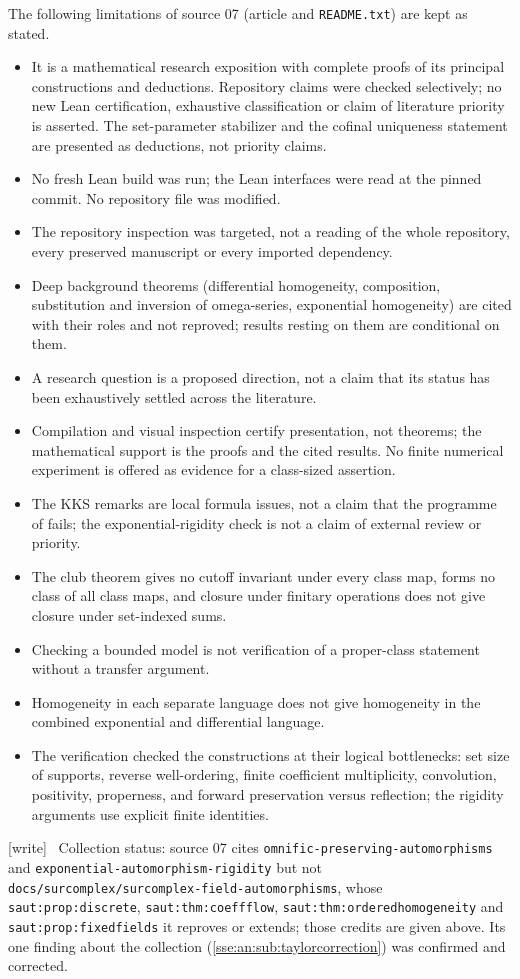 \documentclass[11pt,a4paper]{article}
\numberwithin{equation}{section}
\theoremstyle{plain}
\theoremstyle{definition}
\theoremstyle{remark}
\newcommand{\code}[1]{\texttt{\small #1}}
\newcommand{\lbl}[1]{\nolinkurl{#1}}%
\newcommand{\fn}[1]{\nolinkurl{#1}}%
\newcommand{\wtag}{\textup{\textsf{[write]}}}%
\newenvironment{wnote}{\par\smallskip\noindent\wtag\ }{\par\smallskip}
\begin{document}
The following limitations of source 07 (article and \code{README.txt}) are
kept as stated.
\begin{itemize}
\item It is a mathematical research exposition with complete proofs of its
principal constructions and deductions. Repository claims were checked
selectively; no new Lean certification, exhaustive classification or claim of
literature priority is asserted. The set-parameter stabilizer and the
cofinal uniqueness statement are presented as deductions, not priority claims.
\item No fresh Lean build was run; the Lean interfaces were read at the pinned
commit. No repository file was modified.
\item The repository inspection was targeted, not a reading of the whole
repository, every preserved manuscript or every imported dependency.
\item Deep background theorems (differential homogeneity, composition,
substitution and inversion of omega-series, exponential homogeneity) are
cited with their roles and not reproved; results resting on them are
conditional on them.
\item A research question is a proposed direction, not a claim that its status
has been exhaustively settled across the literature.
\item Compilation and visual inspection certify presentation, not theorems; the
mathematical support is the proofs and the cited results. No finite numerical
experiment is offered as evidence for a class-sized assertion.
\item The KKS remarks are local formula issues, not a claim that the
programme of \cite{KKS} fails; the exponential-rigidity check is not a claim of
external review or priority.
\item The club theorem gives no cutoff invariant under every class map, forms
no class of all class maps, and closure under finitary operations does not
give closure under set-indexed sums.
\item Checking a bounded model is not verification of a proper-class
statement without a transfer argument.
\item Homogeneity in each separate language does not give homogeneity in the
combined exponential and differential language.
\item The verification checked the constructions at their logical bottlenecks:
set size of supports, reverse well-ordering, finite coefficient multiplicity,
convolution, positivity, properness, and forward preservation versus
reflection; the rigidity arguments use explicit finite identities.
\end{itemize}
\begin{wnote}
Collection status: source 07 cites \fn{omnific-preserving-automorphisms} and
\fn{exponential-automorphism-rigidity} but not
\fn{docs/surcomplex/surcomplex-field-automorphisms}, whose
\lbl{saut:prop:discrete}, \lbl{saut:thm:coeffflow},
\lbl{saut:thm:orderedhomogeneity} and \lbl{saut:prop:fixedfields} it reproves
or extends; those credits are given above. Its one finding about the
collection (\cref{sse:an:sub:taylorcorrection}) was confirmed and corrected.
\end{wnote}
\appendix
\end{document}
